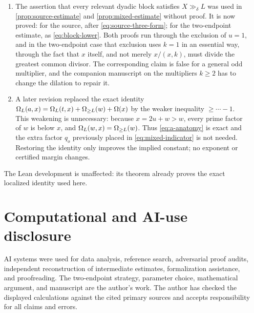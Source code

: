 \documentclass[11pt]{article}
\begin{document}
\begin{enumerate}
\item The assertion that every relevant dyadic block satisfies
      \(X\gg_\delta L\) was used in \cref{prop:source-estimate} and
      \cref{prop:mixed-estimate} without proof. It is now proved: for the
      source, after \eqref{eq:source-three-form}; for the two-endpoint
      estimate, as \eqref{eq:block-lower}. Both proofs run through the
      exclusion of \(u=1\), and in the two-endpoint case that exclusion uses
      \(k=1\) in an essential way, through the fact that \(x\) itself, and not
      merely \(x/(x,k)\), must divide the greatest common divisor. The
      corresponding claim is false for a general odd multiplier, and the
      companion manuscript on the multipliers \(k\geq2\) has to change the
      dilation to repair it.
\item A later revision replaced the exact identity
      \(\Omega_L(a,x)=\Omega_L(t,x)+\Omega_{\geq L}(w)+\Omega(x)\) by the weaker
      inequality \(\geq\cdots-1\). This weakening is unnecessary: because
      \(x=2u+w>w\), every prime factor of \(w\) is below \(x\), and
      \(\Omega_L(w,x)=\Omega_{\geq L}(w)\). Thus \eqref{eq:a-anatomy} is exact
      and the extra factor \(q_o\) previously placed in
      \eqref{eq:mixed-indicator} is not needed. Restoring the identity only
      improves the implied constant; no exponent or certified margin changes.
\end{enumerate}

The Lean development is unaffected: its theorem
 already proves the exact localized identity
used here.

\section*{Computational and AI-use disclosure}

AI systems were used for data analysis, reference search, adversarial proof
audits, independent reconstruction of intermediate estimates, formalization
assistance, and proofreading. The two-endpoint strategy, parameter choice,
mathematical argument, and manuscript are the author's work. The author has
checked the displayed calculations against the cited primary sources and
accepts responsibility for all claims and errors.



\end{document}
